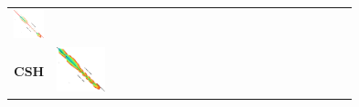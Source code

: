 \begin{figure}[t]
\begin{tabular}{l>{\centering}m{0.18\linewidth}>{\centering}m{0.18\linewidth}>{\centering}m{0.18\linewidth}>{\centering\arraybackslash}m{0.35\linewidth}}
    \includegraphics[scale=0.15]{imgs/comparison/sh-dt.png} \\[1cm]
    \textbf{CSH} &
    \includegraphics[scale=0.15]{imgs/comparison/csh-noprune.png} &

\end{tabular}
\end{figure}
